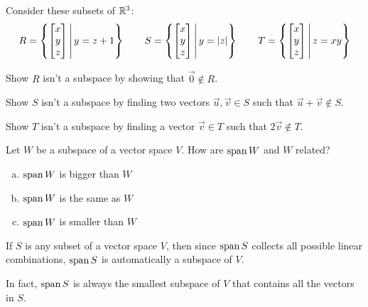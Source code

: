 \begin{activity}{20}
  Consider these subsets of \(\mathbb{R}^3\):
  \[
    R=
    \left\{ \begin{bmatrix}x\\y\\z\end{bmatrix}\,\middle|\,y=z+1\right\}
    \hspace{2em}
    S=
    \left\{ \begin{bmatrix}x\\y\\z\end{bmatrix}\,\middle|\,y=|z|\right\}
    \hspace{2em}
    T=
    \left\{ \begin{bmatrix}x\\y\\z\end{bmatrix}\,\middle|\,z=xy\right\}
  \]
  \begin{subactivity}
  Show \(R\) isn't a subspace by showing that \(\vec 0\not\in R\).
  \end{subactivity}
  \begin{subactivity}
  Show \(S\) isn't a subspace by finding two vectors \(\vec u,\vec v\in S\)
  such that \(\vec u+\vec v\not\in S\).
  \end{subactivity}
  \begin{subactivity}
  Show \(T\) isn't a subspace by finding a vector \(\vec v\in T\)
  such that \(2\vec v\not\in T\).
  \end{subactivity}
\end{activity}



\begin{activity}{5}
Let \(W\) be a subspace of a vector space \(V\).  How are \(\operatorname{span} W\) and \(W\) related?
\begin{enumerate}[(a)]
\item \(\operatorname{span} W\) is bigger than \(W\)
\item \(\operatorname{span} W\) is the same as \(W\)
\item \(\operatorname{span} W\) is smaller than \(W\)
\end{enumerate}
\end{activity}

\begin{fact}
  If \(S\) is any subset of a vector space \(V\), then
  since \(\operatorname{span} S\) collects all possible linear combinations,
  \(\operatorname{span} S\) is automatically a subspace of \(V\).

  \vspace{1em}

  In fact, \(\operatorname{span} S\) is always the smallest
  subspace of \(V\) that contains all the vectors in \(S\).
\end{fact}



